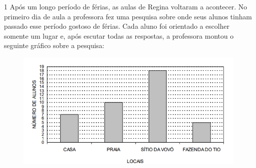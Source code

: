 
\pagebreak
{}

\num{1} Após um longo período de férias, as aulas de Regina voltaram a
acontecer. No primeiro dia de aula a professora fez uma pesquisa sobre
onde seus alunos tinham passado esse período gostoso de férias. Cada
aluno foi orientado a escolher somente um lugar e, após escutar todas as
respostas, a professora montou o seguinte gráfico sobre a pesquisa:

\begin{figure}[htpb!]
\includegraphics[width=\textwidth]{./imgs/mat11.png}
\end{figure}

